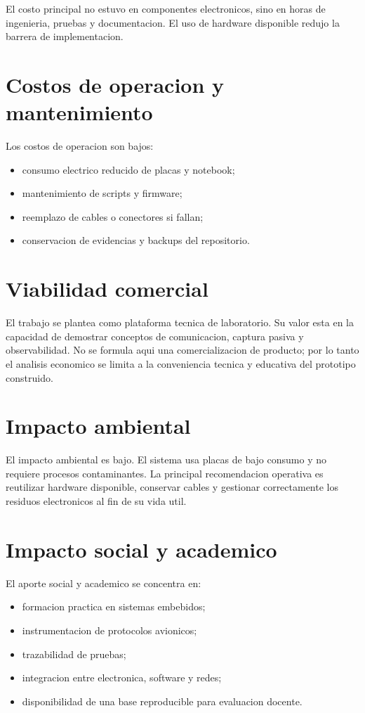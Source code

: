 \documentclass[12pt,a4paper,oneside]{report}
\begin{document}
El costo principal no estuvo en componentes electronicos, sino en horas de
ingenieria, pruebas y documentacion. El uso de hardware disponible redujo la
barrera de implementacion.

\section{Costos de operacion y mantenimiento}

Los costos de operacion son bajos:

\begin{itemize}
  \item consumo electrico reducido de placas y notebook;
  \item mantenimiento de scripts y firmware;
  \item reemplazo de cables o conectores si fallan;
  \item conservacion de evidencias y backups del repositorio.
\end{itemize}

\section{Viabilidad comercial}

El trabajo se plantea como plataforma tecnica de laboratorio. Su valor esta en
la capacidad de demostrar conceptos de comunicacion, captura pasiva y
observabilidad. No se formula aqui una comercializacion de producto; por lo
tanto el analisis economico se limita a la conveniencia tecnica y educativa del
prototipo construido.

\section{Impacto ambiental}

El impacto ambiental es bajo. El sistema usa placas de bajo consumo y no
requiere procesos contaminantes. La principal recomendacion operativa es
reutilizar hardware disponible, conservar cables y gestionar correctamente los
residuos electronicos al fin de su vida util.

\section{Impacto social y academico}

El aporte social y academico se concentra en:

\begin{itemize}
  \item formacion practica en sistemas embebidos;
  \item instrumentacion de protocolos avionicos;
  \item trazabilidad de pruebas;
  \item integracion entre electronica, software y redes;
  \item disponibilidad de una base reproducible para evaluacion docente.
\end{itemize}
\end{document}
